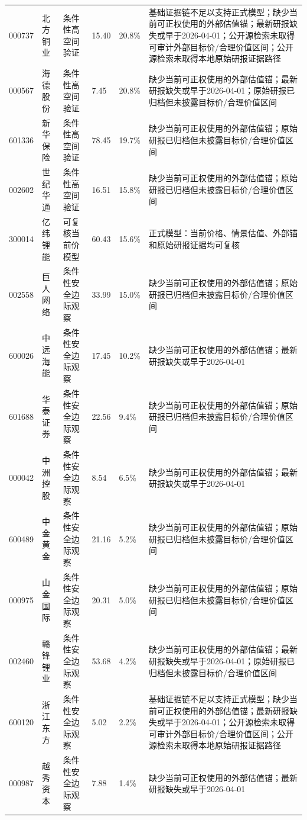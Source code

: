 \begin{longtable}{L{1.0cm}L{1.6cm}L{2.5cm}R{1.1cm}R{1.0cm}L{7.0cm}}
000737 & 北方铜业 & 条件性高空间验证 & 15.40 & 20.8\% & 基础证据链不足以支持正式模型；缺少当前可正权使用的外部估值锚；最新研报缺失或早于2026-04-01；公开源检索未取得可审计外部目标价/合理价值区间；公开源检索未取得本地原始研报证据路径 \\
000567 & 海德股份 & 条件性高空间验证 & 7.45 & 20.8\% & 缺少当前可正权使用的外部估值锚；最新研报缺失或早于2026-04-01；原始研报已归档但未披露目标价/合理价值区间 \\
601336 & 新华保险 & 条件性高空间验证 & 78.45 & 19.7\% & 缺少当前可正权使用的外部估值锚；原始研报已归档但未披露目标价/合理价值区间 \\
002602 & 世纪华通 & 条件性高空间验证 & 16.51 & 15.8\% & 缺少当前可正权使用的外部估值锚；原始研报已归档但未披露目标价/合理价值区间 \\
300014 & 亿纬锂能 & 可复核当前价模型 & 60.43 & 15.6\% & 正式模型：当前价格、情景估值、外部锚和原始研报证据均可复核 \\
002558 & 巨人网络 & 条件性安全边际观察 & 33.99 & 15.0\% & 缺少当前可正权使用的外部估值锚；原始研报已归档但未披露目标价/合理价值区间 \\
600026 & 中远海能 & 条件性安全边际观察 & 17.45 & 10.2\% & 缺少当前可正权使用的外部估值锚；最新研报缺失或早于2026-04-01 \\
601688 & 华泰证券 & 条件性安全边际观察 & 22.56 & 9.4\% & 缺少当前可正权使用的外部估值锚；原始研报已归档但未披露目标价/合理价值区间 \\
000042 & 中洲控股 & 条件性安全边际观察 & 8.54 & 6.5\% & 缺少当前可正权使用的外部估值锚；最新研报缺失或早于2026-04-01 \\
600489 & 中金黄金 & 条件性安全边际观察 & 21.16 & 5.2\% & 缺少当前可正权使用的外部估值锚；原始研报已归档但未披露目标价/合理价值区间 \\
000975 & 山金国际 & 条件性安全边际观察 & 20.31 & 5.0\% & 缺少当前可正权使用的外部估值锚；原始研报已归档但未披露目标价/合理价值区间 \\
002460 & 赣锋锂业 & 条件性安全边际观察 & 53.68 & 4.2\% & 缺少当前可正权使用的外部估值锚；最新研报缺失或早于2026-04-01；原始研报已归档但未披露目标价/合理价值区间 \\
600120 & 浙江东方 & 条件性安全边际观察 & 5.02 & 2.2\% & 基础证据链不足以支持正式模型；缺少当前可正权使用的外部估值锚；最新研报缺失或早于2026-04-01；公开源检索未取得可审计外部目标价/合理价值区间；公开源检索未取得本地原始研报证据路径 \\
000987 & 越秀资本 & 条件性安全边际观察 & 7.88 & 1.4\% & 缺少当前可正权使用的外部估值锚；最新研报缺失或早于2026-04-01 \\

\end{longtable}
